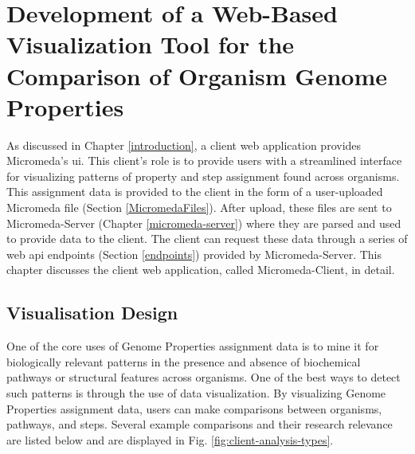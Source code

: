 \chapter{Development of a Web-Based Visualization Tool for the Comparison of Organism Genome Properties} \label{micromeda-client}

As discussed in Chapter \ref{introduction}, a client web application provides Micromeda's \gls{ui}. This client's role is to provide users with a streamlined interface for visualizing patterns of property and step assignment found across organisms. This assignment data is provided to the client in the form of a user-uploaded Micromeda file (Section \ref{MicromedaFiles}). After upload, these files are sent to Micromeda-Server (Chapter \ref{micromeda-server}) where they are parsed and used to provide data to the client. The client can request these data through a series of web \gls{api} endpoints (Section \ref{endpoints}) provided by Micromeda-Server. This chapter discusses the client web application, called Micromeda-Client, in detail.

\section{Visualisation Design} \label{visualization-design}

One of the core uses of Genome Properties assignment data is to mine it for biologically relevant patterns in the presence and absence of biochemical pathways or structural features across organisms. One of the best ways to detect such patterns is through the use of data visualization. By visualizing Genome Properties assignment data, users can make comparisons between organisms, pathways, and steps. Several example comparisons and their research relevance are listed below and are displayed in Fig. \ref{fig:client-analysis-types}. 

